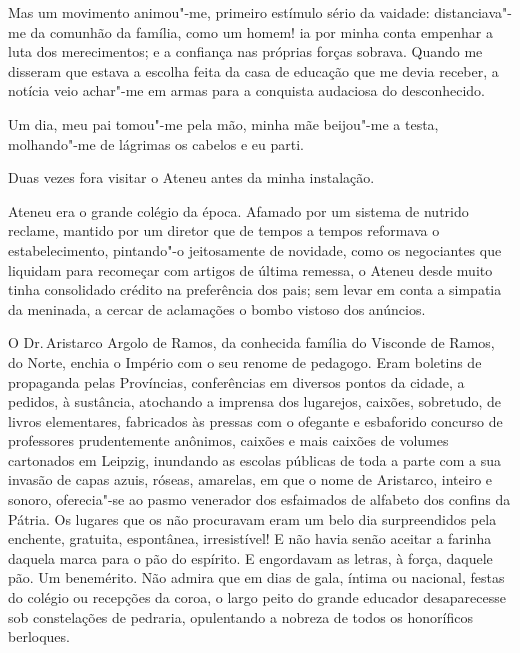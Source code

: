 Mas um movimento animou"-me, primeiro estímulo sério da vaidade: 
distanciava"-me da comunhão da família, como um homem! ia por minha conta 
empenhar a luta dos merecimentos; e a confiança nas próprias forças sobrava. 
Quando me disseram que estava a escolha feita da casa de educação que me devia
receber, a notícia veio achar"-me em armas para a conquista audaciosa
do desconhecido. 

Um dia, meu pai tomou"-me pela mão, minha mãe
beijou"-me a testa, molhando"-me de lágrimas os cabelos e eu parti.

Duas vezes fora visitar o Ateneu antes da minha instalação. 

Ateneu era o grande colégio da época. Afamado por um sistema de nutrido reclame,
mantido por um diretor que de tempos a tempos reformava o
estabelecimento, pintando"-o jeitosamente de novidade, como os
negociantes que liquidam para recomeçar com artigos de última remessa,
o Ateneu desde muito tinha consolidado crédito na preferência dos pais;
sem levar em conta a simpatia da meninada, a cercar de aclamações o
bombo vistoso dos anúncios. 

O Dr.\,Aristarco Argolo de Ramos, da
conhecida família do Visconde de Ramos, do Norte, enchia o Império com
o seu renome de pedagogo. Eram boletins de propaganda pelas Províncias,
conferências em diversos pontos da cidade, a pedidos, à sustância,
atochando a imprensa dos lugarejos, caixões, sobretudo, de livros
elementares, fabricados às pressas com o ofegante e esbaforido concurso
de professores prudentemente anônimos, caixões e mais caixões de
volumes cartonados em Leipzig, inundando as escolas públicas de toda a
parte com a sua invasão de capas azuis, róseas, amarelas, em que o nome
de Aristarco, inteiro e sonoro, oferecia"-se ao pasmo venerador dos
esfaimados de alfabeto dos confins da Pátria. Os lugares que os não
procuravam eram um belo dia surpreendidos pela enchente, gratuita,
espontânea, irresistível! E não havia senão aceitar a farinha daquela
marca para o pão do espírito. E engordavam as letras, à força, daquele
pão. Um benemérito. Não admira que em dias de gala, íntima ou nacional,
festas do colégio ou recepções da coroa, o largo peito do grande
educador desaparecesse sob constelações de pedraria, opulentando a
nobreza de todos os honoríficos berloques. 

